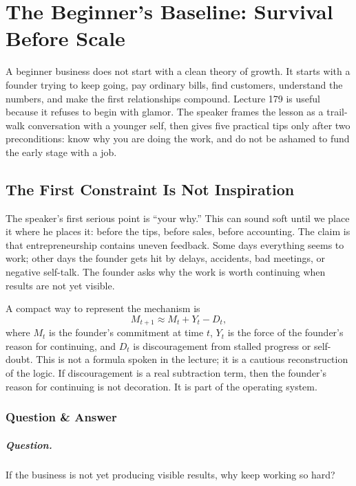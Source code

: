 \documentclass[11pt,oneside]{book}
\begin{document}
\chapter{The Beginner's Baseline: Survival Before Scale}

A beginner business does not start with a clean theory of growth. It starts with a founder trying to keep going, pay ordinary bills, find customers, understand the numbers, and make the first relationships compound. Lecture 179 is useful because it refuses to begin with glamor. The speaker frames the lesson as a trail-walk conversation with a younger self, then gives five practical tips only after two preconditions: know why you are doing the work, and do not be ashamed to fund the early stage with a job.

\section{The First Constraint Is Not Inspiration}

The speaker's first serious point is ``your why.'' This can sound soft until we place it where he places it: before the tips, before sales, before accounting. The claim is that entrepreneurship contains uneven feedback. Some days everything seems to work; other days the founder gets hit by delays, accidents, bad meetings, or negative self-talk. The founder asks why the work is worth continuing when results are not yet visible.

A compact way to represent the mechanism is
\[
M_{t+1}\approx M_t+Y_t-D_t,
\]
where \(M_t\) is the founder's commitment at time \(t\), \(Y_t\) is the force of the founder's reason for continuing, and \(D_t\) is discouragement from stalled progress or self-doubt. This is not a formula spoken in the lecture; it is a cautious reconstruction of the logic. If discouragement is a real subtraction term, then the founder's reason for continuing is not decoration. It is part of the operating system.

\subsection{Question \& Answer}

\paragraph{Question.}
If the business is not yet producing visible results, why keep working so hard?
\end{document}
